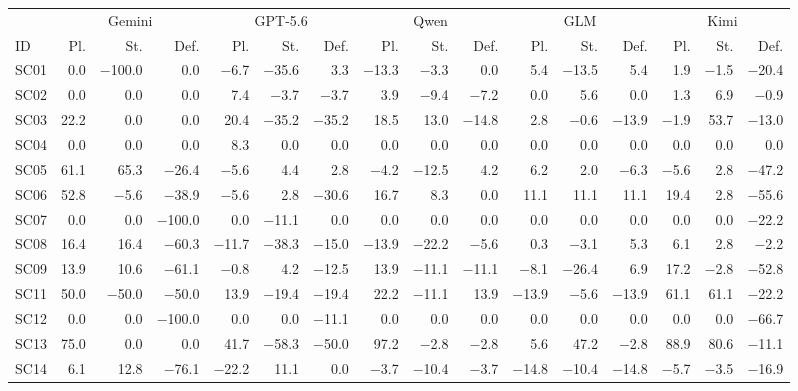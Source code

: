\begin{tabular}{@{}l rrr rrr rrr rrr rrr@{}}
\toprule
 & \multicolumn{3}{c}{Gemini} & \multicolumn{3}{c}{GPT-5.6} & \multicolumn{3}{c}{Qwen} & \multicolumn{3}{c}{GLM} & \multicolumn{3}{c}{Kimi} \\
\cmidrule(lr){2-4} \cmidrule(lr){5-7} \cmidrule(lr){8-10} \cmidrule(lr){11-13} \cmidrule(lr){14-16}
ID & Pl. & St. & Def. & Pl. & St. & Def. & Pl. & St. & Def. & Pl. & St. & Def. & Pl. & St. & Def. \\
\midrule
SC01 & 0.0 & $-$100.0 & 0.0 & $-$6.7 & $-$35.6 & 3.3 & $-$13.3 & $-$3.3 & 0.0 & 5.4 & $-$13.5 & 5.4 & 1.9 & $-$1.5 & $-$20.4 \\
SC02 & 0.0 & 0.0 & 0.0 & 7.4 & $-$3.7 & $-$3.7 & 3.9 & $-$9.4 & $-$7.2 & 0.0 & 5.6 & 0.0 & 1.3 & 6.9 & $-$0.9 \\
SC03 & 22.2 & 0.0 & 0.0 & 20.4 & $-$35.2 & $-$35.2 & 18.5 & 13.0 & $-$14.8 & 2.8 & $-$0.6 & $-$13.9 & $-$1.9 & 53.7 & $-$13.0 \\
SC04 & 0.0 & 0.0 & 0.0 & 8.3 & 0.0 & 0.0 & 0.0 & 0.0 & 0.0 & 0.0 & 0.0 & 0.0 & 0.0 & 0.0 & 0.0 \\
SC05 & 61.1 & 65.3 & $-$26.4 & $-$5.6 & 4.4 & 2.8 & $-$4.2 & $-$12.5 & 4.2 & 6.2 & 2.0 & $-$6.3 & $-$5.6 & 2.8 & $-$47.2 \\
SC06 & 52.8 & $-$5.6 & $-$38.9 & $-$5.6 & 2.8 & $-$30.6 & 16.7 & 8.3 & 0.0 & 11.1 & 11.1 & 11.1 & 19.4 & 2.8 & $-$55.6 \\
SC07 & 0.0 & 0.0 & $-$100.0 & 0.0 & $-$11.1 & 0.0 & 0.0 & 0.0 & 0.0 & 0.0 & 0.0 & 0.0 & 0.0 & 0.0 & $-$22.2 \\
SC08 & 16.4 & 16.4 & $-$60.3 & $-$11.7 & $-$38.3 & $-$15.0 & $-$13.9 & $-$22.2 & $-$5.6 & 0.3 & $-$3.1 & 5.3 & 6.1 & 2.8 & $-$2.2 \\
SC09 & 13.9 & 10.6 & $-$61.1 & $-$0.8 & 4.2 & $-$12.5 & 13.9 & $-$11.1 & $-$11.1 & $-$8.1 & $-$26.4 & 6.9 & 17.2 & $-$2.8 & $-$52.8 \\
SC11 & 50.0 & $-$50.0 & $-$50.0 & 13.9 & $-$19.4 & $-$19.4 & 22.2 & $-$11.1 & 13.9 & $-$13.9 & $-$5.6 & $-$13.9 & 61.1 & 61.1 & $-$22.2 \\
SC12 & 0.0 & 0.0 & $-$100.0 & 0.0 & 0.0 & $-$11.1 & 0.0 & 0.0 & 0.0 & 0.0 & 0.0 & 0.0 & 0.0 & 0.0 & $-$66.7 \\
SC13 & 75.0 & 0.0 & 0.0 & 41.7 & $-$58.3 & $-$50.0 & 97.2 & $-$2.8 & $-$2.8 & 5.6 & 47.2 & $-$2.8 & 88.9 & 80.6 & $-$11.1 \\
SC14 & 6.1 & 12.8 & $-$76.1 & $-$22.2 & 11.1 & 0.0 & $-$3.7 & $-$10.4 & $-$3.7 & $-$14.8 & $-$10.4 & $-$14.8 & $-$5.7 & $-$3.5 & $-$16.9 \\

\end{tabular}
